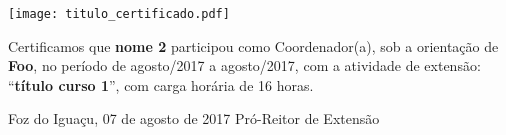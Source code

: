 \documentclass[a4paper,brazil]{article}%
\begin{document}
%
\normalsize%

\pagestyle{empty}
\BgThispage
%
\vspace*{2cm}%
\begin{flushright}%
\texttt{[image: titulo\_certificado.pdf]}%
\linebreak%
\end{flushright}%
\vspace*{-1cm}%
\Large%
%


    Certificamos que \textbf{nome 2} participou como Coordenador(a), sob a orientação de \textbf{Foo}, no período de agosto/2017 a agosto/2017, com a atividade de extensão: ``\textbf{título curso 1}'', com carga horária de 16 horas.

\vspace*{1.5cm}%
\hspace*{7cm}%
\begin{minipage}{\widthof{Foz do Iguaçu, 07 de agosto de 2017}}%
\begin{center}%
Foz do Iguaçu, 07 de agosto de 2017%
\newline%
\newline%
\newline%
Pró{-}Reitor de Extensão%
\end{center}%
\end{minipage}%
\end{document}
